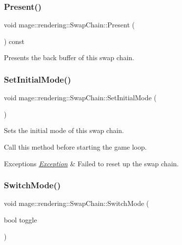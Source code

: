 \subsubsection{\texorpdfstring{Present()}{Present()}}
{\footnotesize\ttfamily void mage\+::rendering\+::\+Swap\+Chain\+::\+Present (\begin{DoxyParamCaption}{ }\end{DoxyParamCaption}) const\hspace{0.3cm}{\ttfamily [noexcept]}}

Presents the back buffer of this swap chain. \mbox{\label{classmage_1_1rendering_1_1_swap_chain_a7ceec40e9007d1d6be3bdcd003fe9985}} 
\subsubsection{\texorpdfstring{Set\+Initial\+Mode()}{SetInitialMode()}}
{\footnotesize\ttfamily void mage\+::rendering\+::\+Swap\+Chain\+::\+Set\+Initial\+Mode (\begin{DoxyParamCaption}{ }\end{DoxyParamCaption})}

Sets the initial mode of this swap chain.

Call this method before starting the game loop.


\begin{DoxyExceptions}{Exceptions}
{\em \mbox{\hyperlink{classmage_1_1_exception}{Exception}}} & Failed to reset up the swap chain. \\
\hline
\end{DoxyExceptions}
\mbox{\label{classmage_1_1rendering_1_1_swap_chain_a184b5aa11bdc69f7b6077de9ec0c47e0}} 
\subsubsection{\texorpdfstring{Switch\+Mode()}{SwitchMode()}}
{\footnotesize\ttfamily void mage\+::rendering\+::\+Swap\+Chain\+::\+Switch\+Mode (\begin{DoxyParamCaption}\item[{bool}]{toggle }\end{DoxyParamCaption})}

